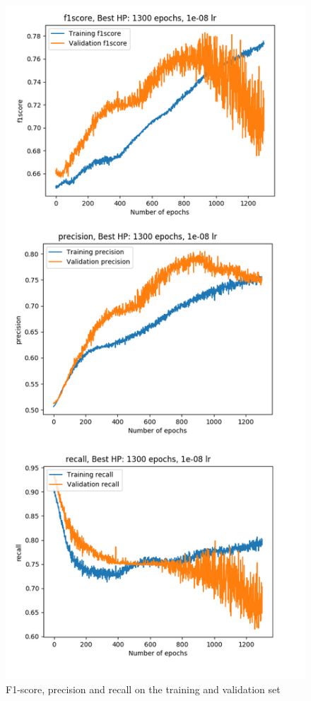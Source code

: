 \begin{figure}[!h]
\centering
\includegraphics[width=1\textwidth, height=\textheight, keepaspectratio=true]{./figures/paper_reproduction_results_part2.png}
\caption{F1-score, precision and recall on the training and validation set}
\label{fig:paper_reprodution_results_part_2}
\end{figure}

